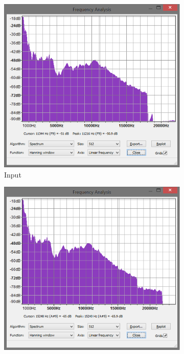 \documentclass[a4paper,twoside,11pt, fleqn]{article}
\begin{document}
\newpage

\begin{figure}[h]
	\begin{subfigure}[b]{0.5\textwidth}	
		\includegraphics[scale=0.5]{Images/spectrum_input.png}
		\caption{Input}
	\end{subfigure}
	\begin{subfigure}[b]{0.6\textwidth}	
		\includegraphics[scale=0.5]{Images/spectrum_offline_256.png}

\end{subfigure}
\end{figure}
\end{document}
